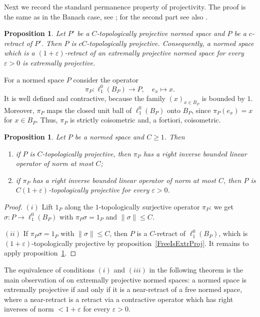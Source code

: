 \documentclass[12pt]{article}
\newtheorem{proposition}[theorem]{Proposition}
\newcommand{\lo}[1]{\ell_1^0(#1)}
\newcommand{\norm}[1]{\lVert #1\rVert}
\begin{document}
Next we record the standard permanence property of projectivity. The proof
is the same as in the Banach case, see \cite[lemma 2.7]{WhiteInjmoduAlg};
for the second part see also
\cite[proposition 1.1]{HelExtrProjSeqAlg}.

\begin{proposition}\label{RetractOfProj} Let $P'$ be a $C$-topologically
    projective normed space and $P$ be a $c$-retract of $P'$. Then $P$ is
    $cC$-topologically projective. Consequently, a normed space which is a
    $(1+\varepsilon)$-retract of an extremally projective normed space for every
    $\varepsilon>0$ is extremally projective.
\end{proposition}

For a normed space $P$ consider the operator
\[
\pi_P:\lo{B_P}\to P,\quad e_x\mapsto x.
\]
It is well defined and contractive, because the family
${(x)}_{x\in B_P}$ is bounded by $1$. Moreover, $\pi_P$ maps the closed unit
ball of $\lo{B_P}$ onto $B_P$, since $\pi_P(e_x)=x$ for $x\in B_P$. Thus,
$\pi_P$ is strictly coisometric and, a fortiori, coisometric.

\begin{proposition}\label{CanonicalMorphismCriterion} Let $P$ be a normed
    space and $C\geq 1$. Then
    \begin{enumerate}[label = (\roman*)]
        \item if $P$ is $C$-topologically projective, then $\pi_P$ has a right
              inverse bounded linear operator of norm at most $C$;
        \item if $\pi_P$ has a right inverse bounded linear operator of norm at
              most $C$, then $P$ is $C(1+\varepsilon)$-topologically projective
              for every $\varepsilon>0$.
    \end{enumerate}
\end{proposition}
\begin{proof} $(i)$ Lift $1_P$ along the $1$-topologically surjective operator
    $\pi_P$: we get $\sigma:P\to\lo{B_P}$ with $\pi_P\sigma=1_P$ and
    $\norm{\sigma}\leq C$.

    $(ii)$ If $\pi_P\sigma=1_P$ with $\norm{\sigma}\leq C$, then $P$ is a
    $C$-retract of $\lo{B_P}$, which is $(1+\varepsilon)$-topologically
    projective by proposition~\ref{FreeIsExtrProj}. It remains to apply
    proposition~\ref{RetractOfProj}.
\end{proof}

The equivalence of conditions $(i)$ and $(iii)$ in the following theorem is
the main observation of \cite[section 2]{HelExtrProjSeqAlg} on extremally
projective normed spaces: a normed space is extremally projective if and only
if it is a near-retract of a free normed space, where a near-retract is a
retract via a contractive operator which has right inverses of norm
$<1+\varepsilon$ for every $\varepsilon>0$.
\end{document}
